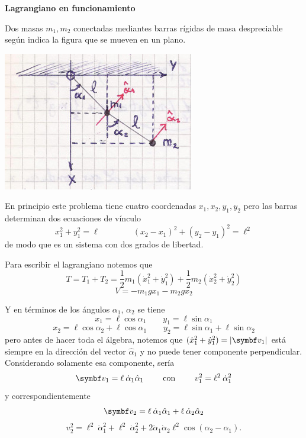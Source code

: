 \documentclass[10pt,oneside]{CBFT_book}
\begin{document}
\begin{ejemplo}{\bf Lagrangiano en funcionamiento}

Dos masas $m_1, m_2$ conectadas mediantes barras rígidas de masa despreciable según indica la figura que se mueven en 
un plano.

\includegraphics[scale=0.35]{images/fig_mc_clasica_pendulo_doble.jpg}

En principio este problema tiene cuatro coordenadas $x_1,x_2,y_1,y_2$ pero las barras determinan dos ecuaciones de 
vínculo
\[
	x_1^2 + y_1^2 = \ell  \qquad \qquad (x_2-x_1)^2 + (y_2-y_1)^2 = \ell^2
\]
de modo que es un sistema con dos grados de libertad.


Para escribir el lagrangiano notemos que 
\[
	T = T_1 + T_2 = \frac 1 2 m_1 ( \dot{x}_1^2 + \dot{y}_1^2 ) + \frac 1 2 m_2 ( \dot{x}_2^2 + \dot{y}_2^2 ) 
\]
\[
	V = -m_1 g x_1 - m_2 g x_2
\]

Y en términos de los ángulos $\alpha_1$, $\alpha_2$ se tiene 
\[
	x_1 = \ell \cos \alpha_1 \qquad y_1 = \ell \sin \alpha_1 
\]
\[
	x_2 = \ell \cos \alpha_2 + \ell \cos \alpha_1 \qquad y_2 = \ell \sin \alpha_1 + \ell \sin \alpha_2
\]
pero antes de hacer toda el álgebra, notemos que $( \dot{x}_1^2 + \dot{y}_1^2 ) = |\vb{v}_1| $ está siempre en la 
dirección del vector $\hat{\alpha}_1$ y no puede tener componente perpendicular. Considerando solamente esa componente, 
sería
\[
	\vb{v}_1 = \ell \: \dot{\alpha}_1 \hat{\alpha}_1 \qquad \text{ con } \qquad v_1^2 = \ell^2 \: \dot{\alpha}_1^2
\]
y correspondientemente
\[
	\vb{v}_2 = \ell \: \dot{\alpha}_1 \hat{\alpha}_1 + \ell \: \dot{\alpha}_2 \hat{\alpha}_2
\]
\[
	v_2^2 = \ell^2 \: \dot{\alpha}_1^2 + \ell^2 \: \dot{\alpha}_2^2 + 2 \dot{\alpha}_1 \dot{\alpha}_2 \ell^2
	\cos ( \alpha_2 - \alpha_1 ).
\]
\end{ejemplo}
\end{document}
